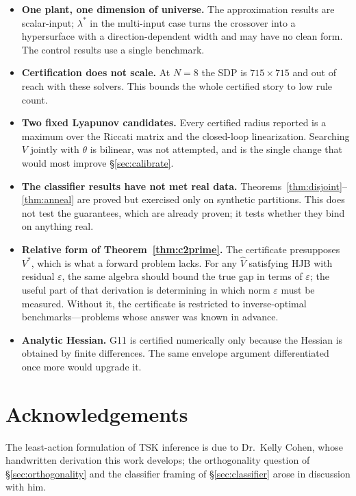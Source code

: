 \documentclass[11pt]{article}
\theoremstyle{plain}
\theoremstyle{definition}
\begin{document}
\begin{itemize}
\item \textbf{One plant, one dimension of universe.} The approximation results
are scalar-input; $\lambda^{*}$ in the multi-input case turns the crossover into
a hypersurface with a direction-dependent width and may have no clean form. The
control results use a single benchmark.

\item \textbf{Certification does not scale.} At $N=8$ the SDP is $715\times715$
and out of reach with these solvers. This bounds the whole certified story to
low rule count.

\item \textbf{Two fixed Lyapunov candidates.} Every certified radius reported is
a maximum over the Riccati matrix and the closed-loop linearization. Searching
$V$ jointly with $\theta$ is bilinear, was not attempted, and is the single
change that would most improve \S\ref{sec:calibrate}.

\item \textbf{The classifier results have not met real data.}
Theorems~\ref{thm:disjoint}--\ref{thm:anneal} are proved but exercised only on
synthetic partitions. This does not test the guarantees, which are already
proven; it tests whether they bind on anything real.

\item \textbf{Relative form of Theorem~\ref{thm:c2prime}.} The certificate
presupposes $V^{*}$, which is what a forward problem lacks. For any $\hat V$
satisfying HJB with residual $\varepsilon$, the same algebra should bound the
true gap in terms of $\varepsilon$; the useful part of that derivation is
determining in which norm $\varepsilon$ must be measured. Without it, the
certificate is restricted to inverse-optimal benchmarks---problems whose answer
was known in advance.

\item \textbf{Analytic Hessian.} G11 is certified numerically only because the
Hessian is obtained by finite differences. The same envelope argument
differentiated once more would upgrade it.
\end{itemize}

\section*{Acknowledgements}

The least-action formulation of TSK inference is due to Dr.\ Kelly Cohen, whose
handwritten derivation this work develops; the orthogonality question of
\S\ref{sec:orthogonality} and the classifier framing of \S\ref{sec:classifier}
arose in discussion with him.
\end{document}
